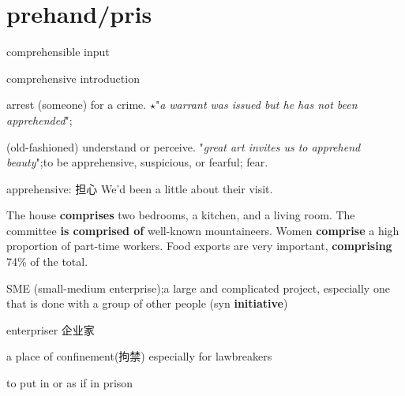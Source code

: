 \chapter{prehand/pris}

\begin{vocabulary}
    comprehensible input
\end{vocabulary}

\begin{vocabulary}[comprehensive]
    comprehensive introduction
\end{vocabulary}

\begin{vocabulary}arrest (someone) for a crime.
    $\star$"\textit{a warrant was issued but he has not been apprehended}";
    
    (old-fashioned) understand or perceive.
    "\textit{great art invites us to apprehend beauty}";to be apprehensive, suspicious, or fearful; fear.

    apprehensive: 担心 We'd been a little  about their visit.
\end{vocabulary}

\begin{vocabulary}[surprise]
\end{vocabulary}

\begin{vocabulary}[comprise]
    The house \textbf{comprises} two bedrooms, a kitchen, and a living room. The committee \textbf{is comprised of} well-known mountaineers. Women \textbf{comprise} a high proportion of part-time workers. Food exports are very important, \textbf{comprising} 74\% of the total.
\end{vocabulary}

\begin{vocabulary}
    SME (small-medium enterprise);a large and complicated project, especially one that is done with a group of other people (syn \textbf{initiative})

    enterpriser 企业家
\end{vocabulary}

\begin{vocabulary}[prison]
    a place of confinement(拘禁) especially for lawbreakers
\end{vocabulary}

\begin{vocabulary}[imprison]
    to put in or as if in prison
\end{vocabulary}